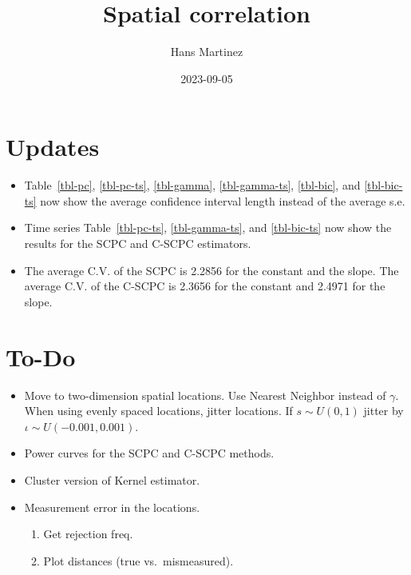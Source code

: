 \documentclass[
]{article}
\title{Spatial correlation}
\author{Hans Martinez}
\date{2023-09-05}
\providecommand{\tightlist}{%
  \setlength{\itemsep}{0pt}\setlength{\parskip}{0pt}}\usepackage{longtable,booktabs,array}
\begin{document}
\maketitle
\ifdefined\Shaded\renewenvironment{Shaded}{\begin{tcolorbox}[enhanced, breakable, sharp corners, frame hidden, interior hidden, borderline west={3pt}{0pt}{shadecolor}, boxrule=0pt]}{\end{tcolorbox}}\fi

\hypertarget{updates}{%
\section*{Updates}\label{updates}}

\begin{itemize}
\tightlist
\item
  Table~\ref{tbl-pc}, \ref{tbl-pc-ts}, \ref{tbl-gamma},
  \ref{tbl-gamma-ts}, \ref{tbl-bic}, and \ref{tbl-bic-ts} now show the
  average confidence interval length instead of the average s.e.
\item
  Time series Table~\ref{tbl-pc-ts}, \ref{tbl-gamma-ts}, and
  \ref{tbl-bic-ts} now show the results for the SCPC and C-SCPC
  estimators.
\item
  The average C.V. of the SCPC is 2.2856 for the constant and the slope.
  The average C.V. of the C-SCPC is 2.3656 for the constant and 2.4971
  for the slope.
\end{itemize}

\hypertarget{to-do}{%
\section*{To-Do}\label{to-do}}

\begin{itemize}
\tightlist
\item
  Move to two-dimension spatial locations. Use Nearest Neighbor instead
  of \(\gamma\). When using evenly spaced locations, jitter locations.
  If \(s\sim U(0,1)\) jitter by \(\iota\sim U(-0.001,0.001)\).
\item
  Power curves for the SCPC and C-SCPC methods.
\item
  Cluster version of Kernel estimator.
\item
  Measurement error in the locations.

  \begin{enumerate}
  \def\labelenumi{\alph{enumi}.}
  \tightlist
  \item
    Get rejection freq.
  \item
    Plot distances (true vs.~mismeasured).
  \end{enumerate}
\end{itemize}
\end{document}
